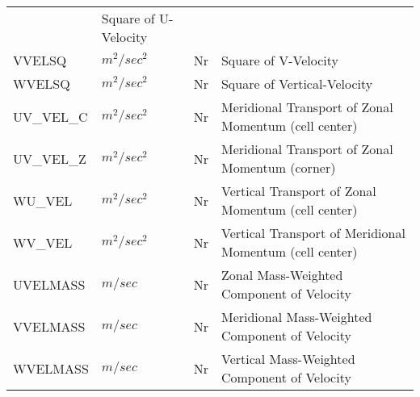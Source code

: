 \begin{table}
\begin{tabular}{llll}
         &\begin{minipage}[t]{3in}
          {Square of U-Velocity} 
         \end{minipage}\\
 VVELSQ   & $m^2/sec^2$ & Nr
         &\begin{minipage}[t]{3in}
          {Square of V-Velocity} 
         \end{minipage}\\
 WVELSQ   & $m^2/sec^2$ & Nr
         &\begin{minipage}[t]{3in}
          {Square of Vertical-Velocity} 
         \end{minipage}\\
 UV\_VEL\_C & $m^2/sec^2$ & Nr
         &\begin{minipage}[t]{3in}
          {Meridional Transport of Zonal Momentum (cell center)} 
         \end{minipage}\\
 UV\_VEL\_Z & $m^2/sec^2$ & Nr
         &\begin{minipage}[t]{3in}
          {Meridional Transport of Zonal Momentum (corner)} 
         \end{minipage}\\
 WU\_VEL   & $m^2/sec^2$ & Nr
         &\begin{minipage}[t]{3in}
          {Vertical Transport of Zonal Momentum (cell center)} 
         \end{minipage}\\
 WV\_VEL   & $m^2/sec^2$ & Nr
         &\begin{minipage}[t]{3in}
          {Vertical Transport of Meridional Momentum (cell center)} 
         \end{minipage}\\
 UVELMASS & $m/sec$ & Nr
         &\begin{minipage}[t]{3in}
          {Zonal Mass-Weighted Component of Velocity} 
         \end{minipage}\\
 VVELMASS & $m/sec$ & Nr
         &\begin{minipage}[t]{3in}
          {Meridional Mass-Weighted Component of Velocity} 
         \end{minipage}\\
 WVELMASS & $m/sec$ & Nr
         &\begin{minipage}[t]{3in}
          {Vertical Mass-Weighted Component of Velocity} 
         \end{minipage}\\

\end{tabular}
\end{table}
